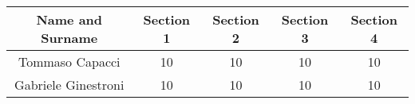 \begin{tabular}{|c|c|c|c|c|}
    \hline
    \textbf{Name and Surname} & \textbf{Section 1} & \textbf{Section 2} & \textbf{Section 3} & \textbf{Section 4} \\
    \hline
    Tommaso Capacci & 10 & 10 & 10 & 10 \\
    \hline
    Gabriele Ginestroni & 10 & 10 & 10 & 10 \\
    \hline
\end{tabular}